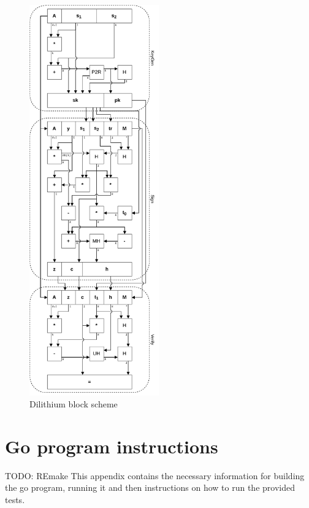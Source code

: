 \begin{figure}[ht!]
  \centering
  \includegraphics[width=0.497\textwidth]{pictures/dil_all.pdf}
  \caption{Dilithium block scheme}
  \label{img:dil_all}
\end{figure}

\chapter{Go program instructions}
TODO: REmake
This appendix contains the necessary information for building the go program, running it and then instructions on how to run the provided tests.
\label{ch:go_instructions}
